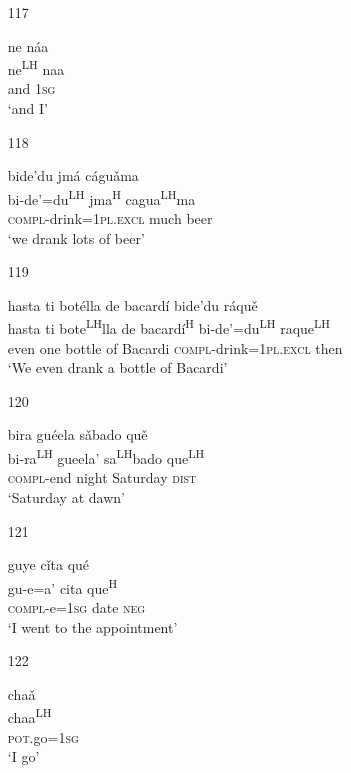 \begin{itemize}
\item[117]

\glll ne n\'{a}a \\
ne\textsuperscript{LH} naa \\
and 1\textsc{sg} \\
\glt  `and I'



\item[118]

\glll bide'du jm\'{a} c\'{a}gu\v{a}ma \\
bi-de'=du\textsuperscript{LH} jma\textsuperscript{H} cagua\textsuperscript{LH}ma \\
\textsc{compl}-drink=1\textsc{pl.excl} much beer \\
\glt  `we drank lots of beer'  



\item[119]
 
\glll   hasta ti bot\'{e}lla de bacard\'{i} bide'du r\'{a}qu\v{e}\\
hasta ti bote\textsuperscript{LH}lla de bacard\'{i}\textsuperscript{H} bi-de'=du\textsuperscript{LH} raque\textsuperscript{LH}\\
even one bottle of Bacardi \textsc{compl}-drink=\textsc{1pl.excl} then\\
\glt `We even drank a bottle of Bacardi' 
 



\item[120]
 
\glll   bira gu\'{e}ela s\v{a}bado qu\v{e}  \\
 bi-ra\textsuperscript{LH} gueela' sa\textsuperscript{LH}bado que\textsuperscript{LH} \\
\textsc{compl}-end night Saturday \textsc{dist}\\
\glt `Saturday at dawn'
 


\item[121]
 
\glll   guye c\v{i}ta qu\'{e}  \\
gu-e=a' cita que\textsuperscript{H} \\
\textsc{compl}-e=\textsc{1sg} date \textsc{neg}\\
\glt `I went to the appointment'
 

\item[122]
 
\glll   cha\v{a} \\
chaa\textsuperscript{LH}\\
\textsc{pot}.go=\textsc{1sg}\\
\glt `I go'
 



\end{itemize}
